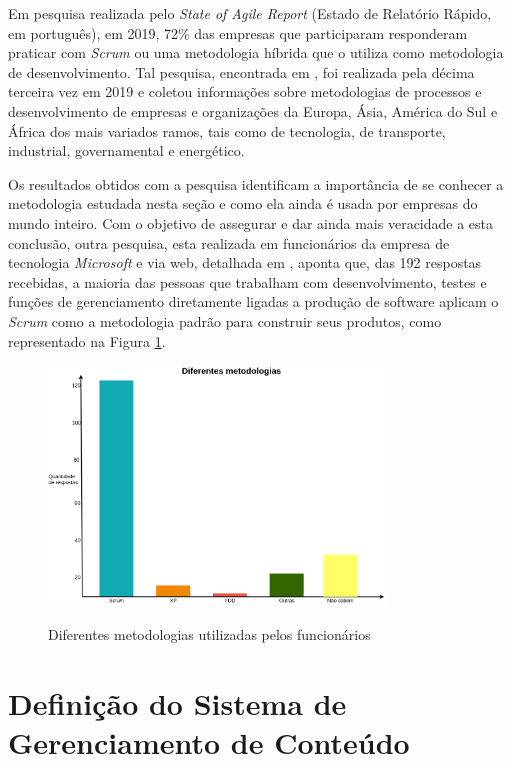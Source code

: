Em pesquisa realizada pelo \textit{State of Agile Report} (Estado de Relatório Rápido, em português), em 2019, 72\% das empresas que participaram responderam praticar com \textit{Scrum} ou uma metodologia híbrida que o utiliza como metodologia de desenvolvimento. Tal pesquisa, encontrada em , foi realizada pela décima terceira vez em 2019 e coletou informações sobre metodologias de processos e desenvolvimento de empresas e organizações da Europa, Ásia, América do Sul e África dos mais variados ramos, tais como de tecnologia, de transporte, industrial, governamental e energético.

Os resultados obtidos com a pesquisa identificam a importância de se conhecer a metodologia estudada nesta seção e como ela ainda é usada por empresas do mundo inteiro. Com o objetivo de assegurar e dar ainda mais veracidade a esta conclusão, outra pesquisa, esta realizada em funcionários da empresa de tecnologia \textit{Microsoft} e via web, detalhada em , aponta que, das 192 respostas recebidas, a maioria das pessoas que trabalham com desenvolvimento, testes e funções de gerenciamento diretamente ligadas a produção de software aplicam o \textit{Scrum} como a metodologia padrão para construir seus produtos, como representado na Figura \ref{ageis-microsoft}. 

\begin{figure}[htb]
 \centering
 \caption{Diferentes metodologias utilizadas pelos funcionários}
 \includegraphics[width=0.8\textwidth]{figuras/diferentes-metodologias}
 \label{ageis-microsoft}
\end{figure}


\hspace{2.5cm}
\section{Definição do Sistema de Gerenciamento de Conteúdo}
\label{sec:defCMS}

